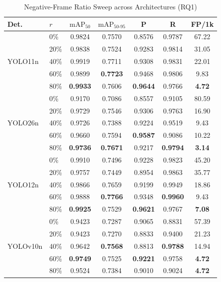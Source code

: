 \documentclass[conference]{IEEEtran}
\begin{document}
\begin{table}[t]
\caption{Negative-Frame Ratio Sweep across Architectures (RQ1)}
\label{tab:rq1}
\centering
\setlength{\tabcolsep}{1.2pt}
\begin{tabular}{llccccc}
\toprule
\textbf{Det.} & \textbf{$r$} &
\textbf{$\mathrm{mAP}_{50}$} &
\textbf{$\mathrm{mAP}_{50\text{-}95}$} &
\textbf{P} & \textbf{R} &
\textbf{FP/1k} \\
\midrule
\multirow{5}{*}{YOLO11n}
& 0\%  & 0.9824 & 0.7570 & 0.8576 & 0.9787 & 67.22 \\
& 20\% & 0.9838 & 0.7524 & 0.9283 & 0.9814 & 31.05 \\
& 40\% & 0.9919 & 0.7711 & 0.9308 & 0.9831 & 22.01 \\
& 60\% & 0.9899 & \textbf{0.7723} & 0.9468 & 0.9806 & 9.83 \\
& 80\% & \textbf{0.9933} & 0.7606 & \textbf{0.9644} & 0.9766 & \textbf{4.72} \\
\midrule
\multirow{5}{*}{YOLO26n}
& 0\%  & 0.9170 & 0.7086 & 0.8557 & 0.9105 & 80.59 \\
& 20\% & 0.9729 & 0.7546 & 0.9306 & 0.9763 & 16.90 \\
& 40\% & 0.9726 & 0.7388 & 0.9224 & 0.9519 & 9.43 \\
& 60\% & 0.9660 & 0.7594 & \textbf{0.9587} & 0.9086 & 10.22 \\
& 80\% & \textbf{0.9736} & \textbf{0.7671} & 0.9217 & \textbf{0.9794} & \textbf{3.14} \\
\midrule
\multirow{5}{*}{YOLO12n}
& 0\%  & 0.9910 & 0.7496 & 0.9228 & 0.9823 & 45.20 \\
& 20\% & 0.9757 & 0.7449 & 0.8954 & 0.9863 & 35.77 \\
& 40\% & 0.9866 & 0.7659 & 0.9199 & 0.9949 & 18.86 \\
& 60\% & 0.9888 & \textbf{0.7766} & 0.9348 & \textbf{0.9960} & 9.43 \\
& 80\% & \textbf{0.9925} & 0.7529 & \textbf{0.9621} & 0.9767 & \textbf{7.08} \\
\midrule
\multirow{5}{*}{YOLOv10n}
& 0\%  & 0.9423 & 0.7287 & 0.9065 & 0.8831 & 57.39 \\
& 20\% & 0.9423 & 0.7270 & 0.8833 & 0.9400 & 21.23 \\
& 40\% & 0.9642 & \textbf{0.7568} & 0.8813 & \textbf{0.9788} & 14.94 \\
& 60\% & \textbf{0.9749} & 0.7525 & \textbf{0.9221} & 0.9758 & \textbf{4.72} \\
& 80\% & 0.9524 & 0.7384 & 0.9010 & 0.9024 & \textbf{4.72} \\

\end{tabular}
\end{table}
\end{document}
